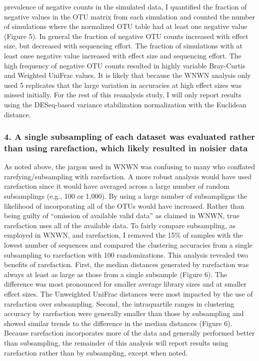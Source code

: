 \documentclass[
]{article}
\begin{document}
prevalence of negative counts in the simulated data, I quantified the
fraction of negative values in the OTU matrix from each simulation and
counted the number of simulations where the normalized OTU table had at
least one negative value (Figure 5). In general the fraction of negative
OTU counts increased with effect size, but decreased with sequencing
effort. The fraction of simulations with at least onee negative value
increased with effect size and sequencing effort. The high frequency of
negative OTU counts resulted in highly variable Bray-Curtis and Weighted
UniFrac values. It is likely that because the WNWN analysis only used 5
replicates that the large variation in accuracies at high effect sizes
was missed initially. For the rest of this reanalysis study, I will only
report results using the DESeq-based variance stabilization
normalization with the Euclidean distance.

\hypertarget{a-single-subsampling-of-each-dataset-was-evaluated-rather-than-using-rarefaction-which-likely-resulted-in-noisier-data}{%
\subsubsection{4. A single subsampling of each dataset was evaluated
rather than using rarefaction, which likely resulted in noisier
data}\label{a-single-subsampling-of-each-dataset-was-evaluated-rather-than-using-rarefaction-which-likely-resulted-in-noisier-data}}

As noted above, the jargon used in WNWN was confusing to many who
conflated rarefying/subsampling with rarefaction. A more robust analysis
would have used rarefaction since it would have averaged across a large
number of random subsamplings (e.g., 100 or 1,000). By using a large
number of subsampligns the likelihood of incorporating all of the OTUs
would have increased. Rather than being guilty of ``omission of
available valid data'' as claimed in WNWN, true rarefaction uses all of
the available data. To fairly compare subsampling, as employed in WNWN,
and rarefaction, I removed the 15\% of samples with the lowest number of
sequences and compared the clustering accuracies from a single
subsampling to rarefaction with 100 randomizations. This analysis
revealed two benefits of rarefaction. First, the median distances
generated by rarefaction was always at least as large as those from a
single subsample (Figure 6). The difference was most pronounced for
smaller average library sizes and at smaller effect sizes. The
Unweighted UniFrac distances were most impacted by the use of
rarefaction over subsampling. Second, the intraquartile ranges in
clustering accuracy by rarefaction were generally smaller than those by
subsampling and showed similar trends to the difference in the median
distances (Figure 6). Because rarefaction incorporates more of the data
and generally performed better than subsampling, the remainder of this
analysis will report results using rarefaction rather than by
subsampling, except when noted.
\end{document}
